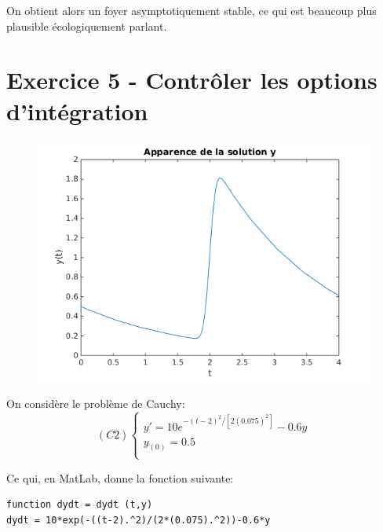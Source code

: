 \documentclass[a4paper,12pt,landscape]{article}
\begin{document}
On obtient alors un foyer asymptotiquement stable, ce qui est beaucoup plus plausible écologiquement parlant.
\newpage
\section{Exercice 5 - Contrôler les options d'intégration}

\begin{figure}
	\includegraphics[scale=0.55]{ex5_1.png}
\end{figure}

On considère le problème de Cauchy:
$$
(C2)
\left \{
\begin{array}{l}
y' = 10 e^{-(t-2)^2 / [2(0.075)^2 ]} - 0.6y\\
y_{(0)} = 0.5\\
\end{array}
\right.
$$

Ce qui, en MatLab, donne la fonction suivante:
\begin{verbatim}
function dydt = dydt (t,y)
dydt = 10*exp(-((t-2).^2)/(2*(0.075).^2))-0.6*y
\end{verbatim}
\end{document}
